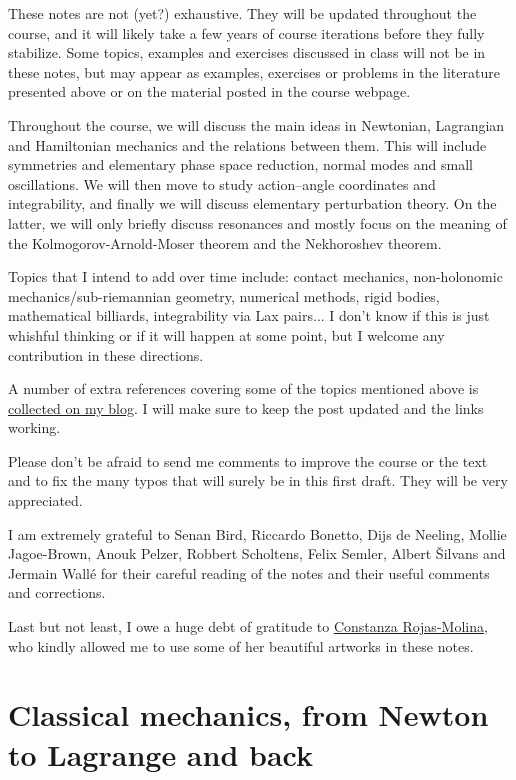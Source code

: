 \documentclass[english,fontsize=11pt,paper=a5,oneside]{scrbook}
\theoremstyle{definition}
\begin{document}
These notes are not (yet?) exhaustive.
They will be updated throughout the course, and it will likely take a few years of course iterations before they fully stabilize.
Some topics, examples and exercises discussed in class will not be in these notes, but may appear as examples, exercises or problems in the literature presented above or on the material posted in the course webpage.

Throughout the course, we will discuss the main ideas in Newtonian, Lagrangian and Hamiltonian mechanics and the relations between them.
This will include symmetries and elementary phase space reduction, normal modes and small oscillations.
We will then move to study action--angle coordinates and integrability, and finally we will discuss elementary perturbation theory.
On the latter, we will only briefly discuss resonances and mostly focus on the meaning of the Kolmogorov-Arnold-Moser theorem and the Nekhoroshev theorem.

Topics that I intend to add over time include: contact mechanics, non-holonomic mechanics/sub-riemannian geometry, numerical methods, rigid bodies, mathematical billiards, integrability via Lax pairs... I don't know if this is just whishful thinking or if it will happen at some point, but I welcome any contribution in these directions.

A number of extra references covering some of the topics mentioned above is \href{https://www.mseri.me/links-from-hm/}{collected on my blog}. I will make sure to keep the post updated and the links working. \medskip

Please don't be afraid to send me comments to improve the course or the text and to fix the many typos that will surely be in this first draft. They will be very appreciated.

I am extremely grateful to Senan Bird, Riccardo Bonetto, Dijs de Neeling, Mollie Jagoe-Brown, Anouk Pelzer, Robbert Scholtens, Felix Semler, Albert \v{S}ilvans and Jermain Wall\'e for their careful reading of the notes and their useful comments and corrections.

Last but not least, I owe a huge debt of gratitude to \href{https://crojasmolina.com}{Constanza Rojas-Molina}, who kindly allowed me to use some of her beautiful artworks in these notes.

\chapter{Classical mechanics, from Newton to Lagrange and back}
\end{document}

